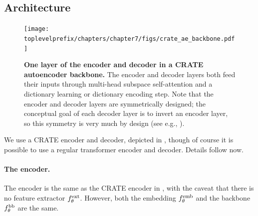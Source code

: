 \documentclass[../../book-main.tex]{subfiles}
\begin{document}
\subsection{Architecture}\label{sub:image_completion_architecture}

\begin{figure}
    \centering 
    \texttt{[image: \\toplevelprefix/chapters/chapter7/figs/crate\_ae\_backbone.pdf]}
    \caption{\small\textbf{One layer of the encoder and decoder in a CRATE autoencoder backbone.} The encoder and decoder layers both feed their inputs through multi-head subspace self-attention and a dictionary learning or dictionary encoding step. Note that the encoder and decoder layers are symmetrically designed; the conceptual goal of each decoder layer is to invert an encoder layer, so this symmetry is very much by design (see e.g., ).}
\end{figure}

We use a CRATE encoder and decoder, depicted in , though of course it is possible to use a regular transformer encoder and decoder. Details follow now.

\paragraph{The encoder.} The encoder is the same as the CRATE encoder in , with the caveat that there is no feature extractor \(f_{\theta}^{\mathrm{ext}}\). However, both the embedding \(f_{\theta}^{\mathrm{emb}}\) and the backbone \(f_{\theta}^{\mathrm{bb}}\) are the same.
\end{document}
